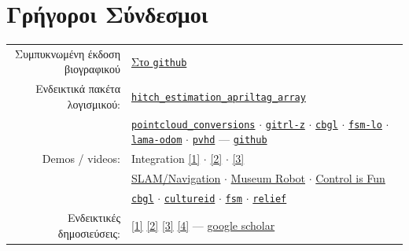 \documentclass[a4paper,10pt,twoside]{article}
\begin{document}
\section*{Γρήγοροι Σύνδεσμοι}

\begin{tabular}{rp{9cm}}

Συμπυκνωμένη έκδοση βιογραφικού & \href{https://docs.google.com/viewerng/viewer?url=https://raw.githubusercontent.com/li9i/CV/master/compact/cv_compact_alexandros_filotheou.pdf}{Στο \texttt{github}} \\
Ενδεικτικά πακέτα λογισμικού: &
\href{https://index.ros.org/p/hitch_estimation_apriltag_array/#humble}{\texttt{hitch\_estimation\_apriltag\_array}} \\
  & \href{https://index.ros.org/r/pointcloud_conversions/#lyrical}{\texttt{pointcloud\_conversions}} $\cdot$
\href{https://github.com/li9i/gitrl-z}{\texttt{gitrl-z}} $\cdot$
\href{https://github.com/cbgl/cbgl}{\texttt{cbgl}} $\cdot$
\href{https://github.com/fourier-scan-matcher/fsm-lo}{\texttt{fsm-lo}} $\cdot$
\href{https://github.com/li9i/lama-odom}{\texttt{lama-odom}} $\cdot$
\href{https://github.com/li9i/pandora\_vision\_2014/tree/hydro-devel/pandora\_vision\_hole\_detector}{\texttt{pvhd}} ---  \href{https://github.com/li9i}{\texttt{github}} \\


Demos / videos: &
    Integration \href{https://www.youtube.com/shorts/TSIXd5L-Hxk}{[1]} $\cdot$
    \href{https://www.youtube.com/watch?v=ViU-9DLi2-M}{[2]} $\cdot$
    \href{https://www.youtube.com/watch?v=xuIbOL-MPRk\&t=10s}{[3]} \\
    &
    \href{https://youtu.be/bo4lMI640DY?t=10}{SLAM/Navigation}  $\cdot$
    \href{https://cultureid.web.auth.gr/?page\_id=200\&lang=en}{Museum Robot} $\cdot$
    \href{https://www.youtube.com/watch?v=937OZez1iN8}{Control is Fun} \\
    &
\href{https://www.youtube.com/watch?v=xaDKjI0WkDc}{\texttt{cbgl}} $\cdot$ \href{https://cultureid.web.auth.gr/?page\_id=200&lang=en}{\texttt{cultureid}} $\cdot$ \href{https://www.youtube.com/watch?v=hB4qsHCEXGI}{\texttt{fsm}} $\cdot$ \href{https://relief.web.auth.gr/}{\texttt{relief}} \\

Ενδεικτικές δημοσιεύσεις: &
\href{https://ieeexplore.ieee.org/abstract/document/10802235}{[1]}
\href{https://ieeexplore.ieee.org/abstract/document/9981228}{[2]}
\href{https://www.sciencedirect.com/science/article/abs/pii/S0921889021002323}{[3]}
\href{https://www.tandfonline.com/doi/full/10.1080/00207179.2018.1514129}{[4]} --- \href{https://scholar.google.com/citations?view\_op=list\_works\&hl=en\&user=9\_hI4hMAAAAJ}{google scholar}\\


\end{tabular}
\end{document}
